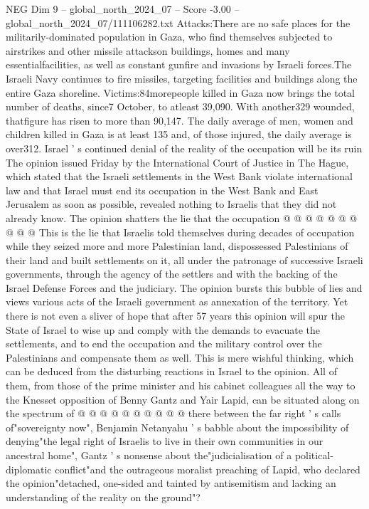 \begin{textsample}{NEG Dim 9 – global\_north\_2024\_07 – Score -3.00 – global\_north\_2024\_07/111106282.txt}  \label{ex:f9_neg_136}
Attacks:There are no safe places for the militarily-dominated population in Gaza, who find themselves subjected to airstrikes and other missile attackson buildings, homes and many essentialfacilities, as well as constant gunfire and invasions by Israeli forces.The Israeli Navy continues to fire missiles, targeting facilities and buildings along the entire Gaza shoreline.
Victims:84morepeople killed in Gaza now brings the total number of deaths, since7 October, to atleast 39,090.
With another329 wounded, thatfigure has risen to more than 90,147.
The daily average of men, women and children killed in Gaza is at least 135 and, of those injured, the daily average is over312.
Israel ' s continued denial of the reality of the occupation will be its ruin The opinion issued Friday by the International Court of Justice in The Hague, which stated that the Israeli settlements in the West Bank violate international law and that Israel must end its occupation in the West Bank and East Jerusalem as soon as possible, revealed nothing to Israelis that they did not already know.
The opinion shatters the lie that the occupation @ @ @ @ @ @ @ @ @ @ This is the lie that Israelis told themselves during decades of occupation while they seized more and more Palestinian land, dispossessed Palestinians of their land and built settlements on it, all under the patronage of successive Israeli governments, through the agency of the settlers and with the backing of the Israel Defense Forces and the judiciary.
The opinion bursts this bubble of lies and views various acts of the Israeli government as annexation of the territory.
Yet there is not even a sliver of hope that after 57 years this opinion will spur the State of Israel to wise up and comply with the demands to evacuate the settlements, and to end the occupation and the military control over the Palestinians and compensate them as well.
This is mere wishful thinking, which can be deduced from the disturbing reactions in Israel to the opinion.
All of them, from those of the prime minister and his cabinet colleagues all the way to the Knesset opposition of Benny Gantz and Yair Lapid, can be situated along on the spectrum of @ @ @ @ @ @ @ @ @ @ there between the far right ' s calls of"sovereignty now", Benjamin Netanyahu ' s babble about the impossibility of denying"the legal right of Israelis to live in their own communities in our ancestral home", Gantz ' s nonsense about the"judicialisation of a political-diplomatic conflict"and the outrageous moralist preaching of Lapid, who declared the opinion"detached, one-sided and tainted by antisemitism and lacking an understanding of the reality on the ground"?

\end{textsample}
